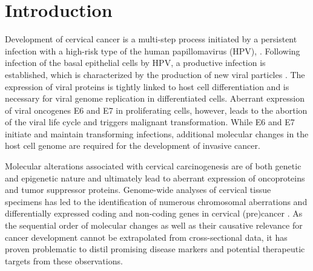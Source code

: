 \section{Introduction}

Development of cervical cancer is a multi-step process initiated by a persistent infection with a high-risk type of the human papillomavirus (HPV),  \cite{Walboomers1999}. Following infection of the basal epithelial cells by HPV, a productive infection is established, which is characterized by the production of new viral particles \cite{Chow2010, Steenbergen2014}. The expression of viral proteins is tightly linked to host cell differentiation and is necessary for viral genome replication in differentiated cells. Aberrant expression of viral oncogenes E6 and E7 in proliferating cells, however, leads to the abortion of the viral life cycle and triggers malignant transformation. While E6 and E7 initiate and maintain transforming infections, additional molecular changes in the host cell genome are required for the development of invasive cancer.

Molecular alterations associated with cervical carcinogenesis are of both genetic and epigenetic nature and ultimately lead to aberrant expression of oncoproteins and tumor suppressor proteins. Genome-wide analyses of cervical tissue specimens has led to the identification of numerous chromosomal aberrations and differentially expressed coding and non-coding genes in cervical (pre)cancer \cite{Thomas2014, Sopov2004, Wong2006, Srivastava2017, Hosseini2017}. As the sequential order of molecular changes as well as their causative relevance for cancer development cannot be extrapolated from cross-sectional data, it has proven problematic to distil promising disease markers and potential therapeutic targets from these observations. 

